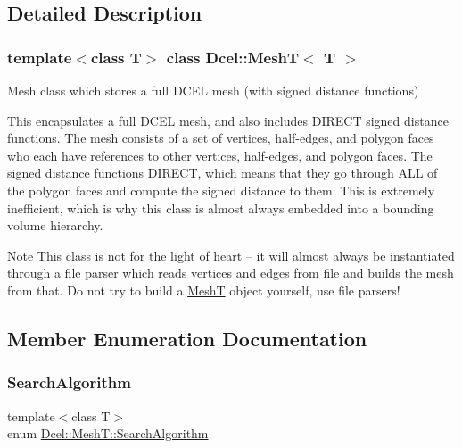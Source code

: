 \subsection{Detailed Description}
\subsubsection*{template$<$class T$>$\newline
class Dcel\+::\+Mesh\+T$<$ T $>$}

Mesh class which stores a full D\+C\+EL mesh (with signed distance functions) 

This encapsulates a full D\+C\+EL mesh, and also includes D\+I\+R\+E\+CT signed distance functions. The mesh consists of a set of vertices, half-\/edges, and polygon faces who each have references to other vertices, half-\/edges, and polygon faces. The signed distance functions D\+I\+R\+E\+CT, which means that they go through A\+LL of the polygon faces and compute the signed distance to them. This is extremely inefficient, which is why this class is almost always embedded into a bounding volume hierarchy. \begin{DoxyNote}{Note}
This class is not for the light of heart -- it will almost always be instantiated through a file parser which reads vertices and edges from file and builds the mesh from that. Do not try to build a \hyperlink{classDcel_1_1MeshT}{MeshT} object yourself, use file parsers! 
\end{DoxyNote}


\subsection{Member Enumeration Documentation}
\mbox{\label{classDcel_1_1MeshT_abb4c3bb7a52804bb041c133f30151399}} 
\subsubsection{\texorpdfstring{Search\+Algorithm}{SearchAlgorithm}}
{\footnotesize\ttfamily template$<$class T$>$ \\
enum \hyperlink{classDcel_1_1MeshT_abb4c3bb7a52804bb041c133f30151399}{Dcel\+::\+Mesh\+T\+::\+Search\+Algorithm}\hspace{0.3cm}{\ttfamily [strong]}}



